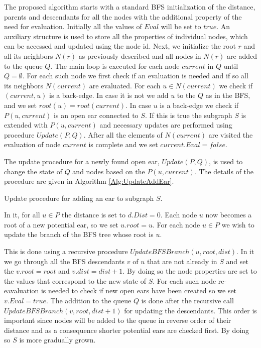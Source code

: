The proposed algorithm starts with a standard BFS initialization of the distance, parents and descendants for all the nodes with the additional property of the need for evaluation. Initially all the values of $Eval$ will be set to $true$. An auxiliary structure is used to store all the properties of individual nodes, which can be accessed and updated using  the node id. Next, we initialize the root $r$ and all its neighbors $N(r)$ as previously described and all nodes in $N(r)$ are added to the queue $Q$. The main loop is executed for each node $current$ in $Q$ until $Q = \emptyset$.  For each such node we first check if an evaluation is needed and if so all its neighbors $N(current)$ are evaluated. For each $u \in N(current)$ we check if $(current, u)$ is a back-edge. In case it is not we add $u$ to the $Q$ as in the BFS, and we set $root(u) = root(current)$. In case $u$ is a back-edge we check if  $P(u,current)$ is an open ear connected to $S$. If this is true the subgraph $S$ is extended with $P(u, current)$ and necessary updates are performed using procedure  $Update(P,Q)$. After all the elements of $N(current)$ are visited the evaluation of node $current$ is complete and we set $current.Eval = false$.  

The update procedure for a newly found open ear, $Update(P,Q)$,  is used to change the state of $Q$ and nodes based on the $P(u, current)$.  The details of the procedure are given in Algorithm \ref{Alg:UpdateAddEar}.
\begin{algorithm}
\begin{algorithmic}
\EndFor
\EndProcedure

  		 \EndIf   
\EndFor
\EndProcedure
\end{algorithmic}
\caption{\label{Alg:UpdateAddEar} Update procedure for adding an ear to subgraph $S$.}
\end{algorithm}
In it, for all $u \in P$ the distance is set to $d.Dist = 0$. Each node $u$ now becomes a root of a new potential ear, so we set $u.root = u$. For each node $u \in P$ we wish to update the branch of the BFS tree whose root is $u$. 

 This is done using a recursive procedure $UpdateBFSBranch(u, root, dist)$.  In it we go through all the BFS descendants $v$ of $u$ that are not already in $S$ and set the $v.root = root$ and $v.dist = dist+1$. By doing so the node properties are set to the values that correspond to the new state of $S$. For each such node re-eavaluation is needed to check if new open ears have been created so we set $v.Eval = true$. The addition  to the queue $Q$ is done after the recursive call $UpdateBFSBranch(v, root, dist+1)$  for updating the descendants. This order is important since nodes will be added to the queue in reverse order of their distance and as a consequence shorter potential ears are checked first. By doing so $S$ is more gradually grown. 
 

